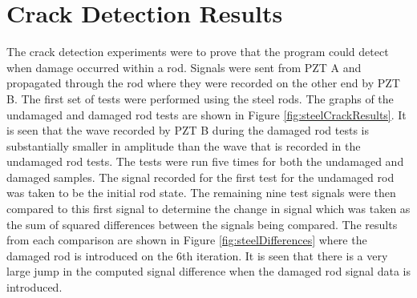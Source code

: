\section{Crack Detection Results}
The crack detection experiments were to prove that the program could detect when damage occurred within a rod. Signals were sent from PZT A and propagated through the rod where they were recorded on the other end by PZT B. The first set of tests were performed using the steel rods. The graphs of the undamaged and damaged rod tests are shown in Figure \ref{fig:steelCrackResults}. It is seen that the wave recorded by PZT B during the damaged rod tests is substantially smaller in amplitude than the wave that is recorded in the undamaged rod tests. The tests were run five times for both the undamaged and damaged samples. The signal recorded for the first test for the undamaged rod was taken to be the initial rod state. The remaining nine test signals were then compared to this first signal to determine the change in signal which was taken as the sum of squared differences between the signals being compared. The results from each comparison are shown in Figure \ref{fig:steelDifferences} where the damaged rod is introduced on the 6th iteration. It is seen that there is a very large jump in the computed signal difference when the damaged rod signal data is introduced. 

